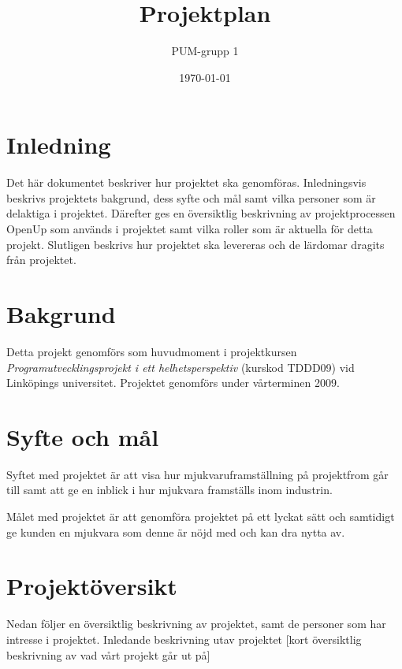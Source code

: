 

\ifpdf
\else
\fi

\title{Projektplan}
\author{PUM-grupp 1}
\date{\today}



\maketitle\thispagestyle{empty}

\newpage

\section{Inledning}
Det här dokumentet beskriver hur projektet ska genomföras. Inledningsvis beskrivs projektets bakgrund, dess syfte och mål samt vilka personer som är delaktiga i projektet. Därefter ges en översiktlig beskrivning av projektprocessen OpenUp som används i projektet samt vilka roller som är aktuella för detta projekt. Slutligen beskrivs hur projektet ska levereras och de lärdomar dragits från projektet.

\section{Bakgrund}
Detta projekt genomförs som huvudmoment i projektkursen \textit{Programutvecklingsprojekt i ett helhetsperspektiv} (kurskod TDDD09) vid Linköpings universitet. Projektet genomförs under vårterminen 2009.

\section{Syfte och mål}
Syftet med projektet är att visa hur mjukvaruframställning på projektfrom går till samt att ge en inblick i hur mjukvara framställs inom industrin.

Målet med projektet är att genomföra projektet på ett lyckat sätt och samtidigt ge kunden en mjukvara som denne är nöjd med och kan dra nytta av.

\section{Projektöversikt}
Nedan följer en översiktlig beskrivning av projektet, samt de personer som har intresse i projektet.
Inledande beskrivning utav projektet
[kort översiktlig beskrivning av vad vårt projekt går ut på]

